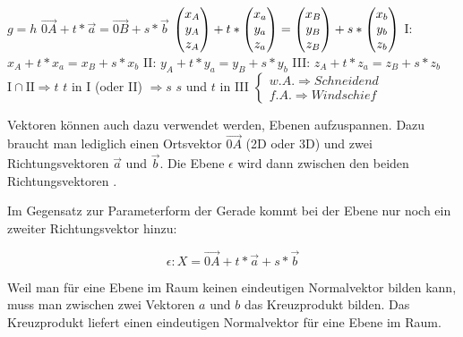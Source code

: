 \begin{center}
  $ g = h$
  \extrapar
  $ \vec{0A} + t * \vec{a} = \vec{0B} + s * \vec{b}$
  \extrapar
  $ \begin{pmatrix}x_{A}\\y_{A}\\z_{A}\end{pmatrix} + t * \begin{pmatrix}x_{a}\\y_{a}\\z_{a}\end{pmatrix} = \begin{pmatrix}x_{B}\\y_{B}\\z_{B}\end{pmatrix} + s* \begin{pmatrix}x_{b}\\y_{b}\\z_{b}\end{pmatrix}$
  \extrapar
  I: $x_{A} + t * x_{a} = x_{B} + s * x_{b}$
  \extrapar
  II: $y_{A} + t * y_{a} = y_{B} + s * y_{b}$
  \extrapar
  III: $z_{A} + t * z_{a} = z_{B} + s * z_{b}$
  \extrapar
  $\text{I} \cap \text{II} \Rightarrow t$
  \extrapar
  $t$ in I (oder II) $\Rightarrow s$
  \extrapar
  $s$ und $t$ in III
  $
  \begin{cases}
    w.A. \Rightarrow Schneidend\\
    f.A. \Rightarrow Windschief
  \end{cases}
  $
\end{center}

\pagebreak


Vektoren k\"{o}nnen auch dazu verwendet werden, Ebenen aufzuspannen. Dazu braucht man lediglich einen Ortsvektor $\vec{0A}$ (2D oder 3D) und zwei Richtungsvektoren $\vec{a}$ und $\vec{b}$. Die Ebene $\epsilon$ wird dann zwischen den beiden Richtungsvektoren .

\begin{figure}[h!]
  \centering
  \large
\end{figure}


Im Gegensatz zur Parameterform der Gerade kommt bei der Ebene nur noch ein zweiter Richtungsvektor hinzu:

$$\epsilon: X = \vec{0A} + t * \vec{a} + s * \vec{b}$$


Weil man f\"{u}r eine Ebene im Raum keinen eindeutigen Normalvektor bilden kann, muss man zwischen zwei Vektoren $a$ und $b$ das Kreuzprodukt bilden. Das Kreuzprodukt liefert einen eindeutigen Normalvektor f\"{u}r eine Ebene im Raum.

